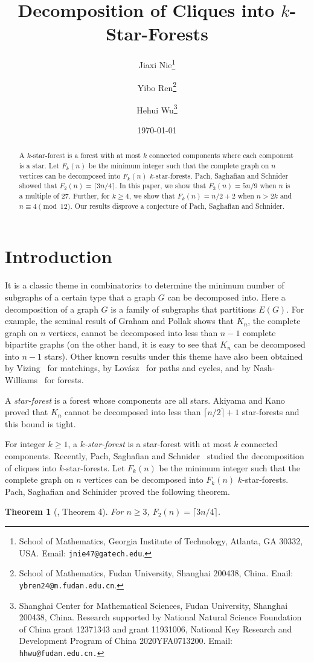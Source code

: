 \documentclass{article}
\title{Decomposition of Cliques into $k$-Star-Forests}
\author{Jiaxi Nie\thanks{School of Mathematics, Georgia Institute of Technology, Atlanta, GA 30332, USA. Email: {\tt jnie47@gatech.edu}.}
 \and Yibo Ren\thanks{School of Mathematics, Fudan University, Shanghai 200438, China. Enail: {\tt ybren24@m.fudan.edu.cn}.} \and Hehui Wu\thanks{Shanghai Center for Mathematical Sciences, Fudan University, Shanghai 200438, China. Research supported by National Natural Science Foundation of China grant 12371343 and grant 11931006, National Key Research and Development Program of China 2020YFA0713200. Email: {\tt hhwu@fudan.edu.cn.}}}
\date{\today}
\newtheorem{thm}{Theorem}[section]
\begin{document}
\maketitle

\begin{abstract}
A $k$-star-forest is a forest with at most $k$ connected components where each component is a star. Let $F_k(n)$ be the minimum integer such that the complete graph on $n$ vertices can be decomposed into $F_k(n)$ $k$-star-forests. Pach, Saghafian and Schnider showed that $F_2(n)=\lceil 3n/4 \rceil$. In this paper, we show that $F_3(n)=5n/9$ when $n$ is a multiple of 27. Further, for $k\ge 4$, we show that $F_k(n)=n/2+2$ when $n>2k$ and $n\equiv 4 \pmod{12}$. Our results disprove a conjecture of Pach, Saghafian and Schnider.
\end{abstract}

\section{Introduction}
It is a classic theme in combinatorics to determine the minimum number of subgraphs of a certain type that a graph $G$ can be decomposed into. Here a decomposition of a graph $G$ is a family of subgraphs that partitions $E(G)$. For example, the seminal result of Graham and Pollak\cite{graham1971addressing} shows that $K_n$, the complete graph on $n$ vertices, cannot be decomposed into less than $n-1$ complete bipartite graphs (on the other hand, it is easy to see that $K_n$ can be decomposed into $n-1$ stars). Other known results under this theme have also been obtained by Vizing~\cite{vizing1964estimate} for matchings, by Lovász~\cite{lovasz1968covering} for paths and cycles, and by Nash-Williams~\cite{nash1964decomposition} for forests. 

 A {\em star-forest} is a forest whose components are all stars. Akiyama and Kano~\cite{akiyama1984path} proved that $K_n$ cannot be decomposed into less than $\lceil n/2\rceil+1$ star-forests and this bound is tight.

 For integer $k\ge 1$, a {\em $k$-star-forest} is a star-forest with at most $k$ connected components. Recently, Pach, Saghafian and Schnider~\cite{pach2023decomposition} studied the decomposition of cliques into $k$-star-forests. Let $F_k(n)$ be the minimum integer such that the complete graph on $n$ vertices can be decomposed into $F_k(n)$ $k$-star-forests. Pach, Saghafian and Schinider proved the following theorem.

\begin{thm}[\cite{pach2023decomposition}, Theorem 4] \label{thm:2-forest}
For $n\ge 3$, $F_2(n)=\lceil3n/4\rceil$.
\end{thm}
\end{document}
